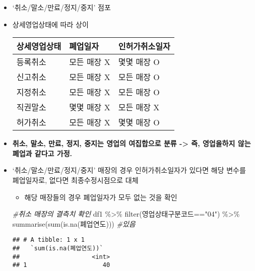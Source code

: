 \documentclass[
]{book}
\newenvironment{Shaded}{\begin{snugshade}}{\end{snugshade}}
\newcommand{\CommentTok}[1]{\textcolor[rgb]{0.56,0.35,0.01}{\textit{#1}}}
\newcommand{\FunctionTok}[1]{\textcolor[rgb]{0.00,0.00,0.00}{#1}}
\newcommand{\NormalTok}[1]{#1}
\newcommand{\SpecialCharTok}[1]{\textcolor[rgb]{0.00,0.00,0.00}{#1}}
\newcommand{\StringTok}[1]{\textcolor[rgb]{0.31,0.60,0.02}{#1}}
\providecommand{\tightlist}{%
  \setlength{\itemsep}{0pt}\setlength{\parskip}{0pt}}
\begin{document}
\begin{itemize}
\item
  `취소/말소/만료/정지/중지' 점포
\item
  상세영업상태에 따라 상이

  \begin{longtable}[]{@{}lll@{}}
  \toprule()
  상세영업상태 & 폐업일자 & 인허가취소일자 \\
  \midrule()
  \endhead
  등록취소 & 모든 매장 X & 몇몇 매장 O \\
  신고취소 & 모든 매장 X & 모든 매장 O \\
  지정취소 & 모든 매장 X & 모든 매장 O \\
  직권말소 & 몇몇 매장 X & 모든 매장 X \\
  허가취소 & 모든 매장 X & 몇몇 매장 O \\
  \bottomrule()
  \end{longtable}
\item
  \textbf{취소, 말소, 만료, 정지, 중지는 영업의 여집합으로 분류 -\textgreater{} 즉, 영업을하지 않는 폐업과 같다고 가정.}
\item
  `취소/말소/만료/정지/중지' 매장의 경우 인허가취소일자가 있다면 해당 변수를 폐업일자로, 없다면 최종수정시점으로 대체

  \begin{itemize}
  \tightlist
  \item
    해당 매장들의 경우 폐업일자가 모두 없는 것을 확인
  \end{itemize}

\begin{Shaded}
\begin{Highlighting}[]
\CommentTok{\#취소 매장의 결측치 확인}
\NormalTok{df1 }\SpecialCharTok{\%\textgreater{}\%} 
  \FunctionTok{filter}\NormalTok{(영업상태구분코드}\SpecialCharTok{==}\StringTok{"04"}\NormalTok{) }\SpecialCharTok{\%\textgreater{}\%} 
  \FunctionTok{summarise}\NormalTok{(}\FunctionTok{sum}\NormalTok{(}\FunctionTok{is.na}\NormalTok{(폐업연도))) }\CommentTok{\#있음}
\end{Highlighting}
\end{Shaded}

\begin{verbatim}
## # A tibble: 1 x 1
##   `sum(is.na(폐업연도))`
##                    <int>
## 1                     40
\end{verbatim}


\end{itemize}
\end{document}
